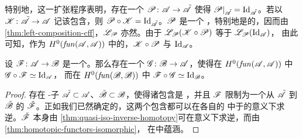 特别地，这一扩张程序表明，存在一个 \trCunital{} \trAFunctor{}%
$\mathscr{P}\colon\mathscr{A}\to\tilde{\mathscr{A}}$ 使得
$\mathscr{P}|_{\tilde{\mathscr{A}}}=\mathrm{Id}_{\tilde{\mathscr{A}}}$。若以
$\mathscr{K}\colon\tilde{\mathscr{A}}\to\mathscr{A}$ 记该包含，则
$\mathscr{P}\circ\mathscr{K}=\mathrm{Id}_{\tilde{\mathscr{A}}}$。$\mathscr{P}$ 是一个%
\trQuasiequivalence，特别地是\trCohomology\trFullyFaithful{}的，因而由%
\cref{thm:left-composition-cff}，$\mathscr{L}_{\mathscr{P}}$ 亦然。由于
$\mathscr{L}_{\mathscr{P}}(\mathscr{K}\circ\mathscr{P})$ 等于 $\mathscr{L}_{\mathscr{P}}(\mathrm{Id}_{\mathscr{A}})$，
由此可知，作为 $H^0(\mathit{fun}(\mathscr{A},\mathscr{A}))$ 中的\trObject，$\mathscr{K}\circ\mathscr{P}$
与 $\mathrm{Id}_{\mathscr{A}}$\trIsomorphic。

\begin{theorem}\label{thm:quasi-equivalence-homotopy-inverse}
设 $\mathscr{F}\colon\mathscr{A}\to\mathscr{B}$ 是一个\trQuasiequivalence。那么存在一个%
\trQuasiequivalence{} $\mathscr{G}\colon\mathscr{B}\to\mathscr{A}$，使得在
$H^0(\mathit{fun}(\mathscr{A},\mathscr{A}))$ 中 $\mathscr{G}\circ\mathscr{F}\simeq\mathrm{Id}_{\mathscr{A}}$，
而在 $H^0(\mathit{fun}(\mathscr{B},\mathscr{B}))$ 中
$\mathscr{F}\circ\mathscr{G}\simeq\mathrm{Id}_{\mathscr{B}}$。
\end{theorem}
\begin{proof}
存在\trFull{} \trAinfty-子\trCategory{}%
$\tilde{\mathscr{A}}\subset\mathscr{A}$、$\tilde{\mathscr{B}}\subset\mathscr{B}$，使得诸包含是%
\trQuasiequivalence，并且 $\mathscr{F}$ 限制为一个从 $\tilde{\mathscr{A}}$ 到 $\tilde{\mathscr{B}}$
的\trQuasiisomorphism{} $\tilde{\mathscr{F}}$。正如我们已然确定的，这两个包含都可以在各自的%
\trFunctor{}\trCategory{}中于\trIsomorphism{}的意义下求逆。$\tilde{\mathscr{F}}$ 本身由%
\cref{thm:quasi-iso-inverse-homotopy}可在\trHomotopy{}意义下求逆，而由\cref{thm:homotopic-functors-isomorphic}，
在\trFunctor{}\trCategory{}中\trHomotopy{}蕴涵\trIsomorphism。
\end{proof}

